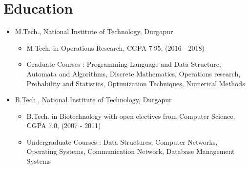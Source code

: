 \documentclass[a4paper,10pt]{article}
\begin{document}
	\section{Education}
	\begin{itemize}
		\item M.Tech., National Institute of Technology, Durgapur
		\begin{itemize}
			\item M.Tech. in Operations Research,  CGPA 7.95, (2016 - 2018)
		\item Graduate Courses : Programming Language and Data Structure, Automata and Algorithms, Discrete Mathematics, Operations research,  Probability and Statistics, Optimization Techniques, Numerical Methods
		\end{itemize}
		
		\item B.Tech., National Institute of Technology, Durgapur
		\begin{itemize}
			\item B.Tech. in Biotechnology with open electives from Computer Science,  CGPA 7.0, (2007 - 2011)
		\item Undergraduate Courses : Data Structures, Computer Networks, Operating Systems, Communication Network, Database Management Systems
		\end{itemize}
	\end{itemize}
	
\end{document}
